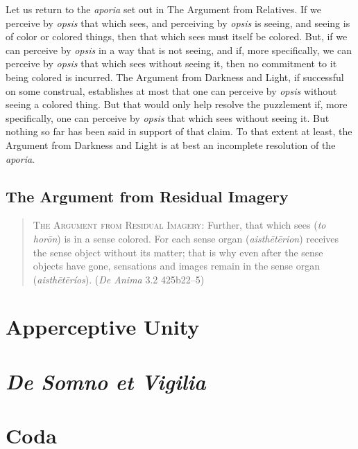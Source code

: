 Let us return to the \emph{aporia} set out in The Argument from Relatives. If we perceive by \emph{opsis} that which sees, and perceiving by \emph{opsis} is seeing, and seeing is of color or colored things, then that which sees must itself be colored. But, if we can perceive by \emph{opsis} in a way that is not seeing, and if, more specifically, we can perceive by \emph{opsis} that which sees without seeing it, then no commitment to it being colored is incurred. The Argument from Darkness and Light, if successful on some construal, establishes at most that one can perceive by \emph{opsis} without seeing a colored thing. But that would only help resolve the puzzlement if, more specifically, one can perceive by \emph{opsis} that which sees without seeing it. But nothing so far has been said in support of that claim. To that extent at least, the Argument from Darkness and Light is at best an incomplete resolution of the \emph{aporia}.


\subsection{The Argument from Residual Imagery} %
\label{sub:the_argument_from_residual_imagery}

\begin{quote}
	\textsc{The Argument from Residual Imagery}: Further, that which sees (\emph{to horōn}) is in a sense colored. For each sense organ (\emph{aisthētērion}) receives the sense object without its matter; that is why even after the sense objects have gone, sensations and images remain in the sense organ (\emph{aisthētēríos}). (\emph{De Anima} 3.2 425b22–5)
\end{quote}



\section{Apperceptive Unity} %
\label{sec:apperceptive_unity}


\section{\emph{De Somno et Vigilia}} %
\label{sec:_emph_de_somno_et_vigilia}


\section{Coda} %
\label{sec:coda2}


